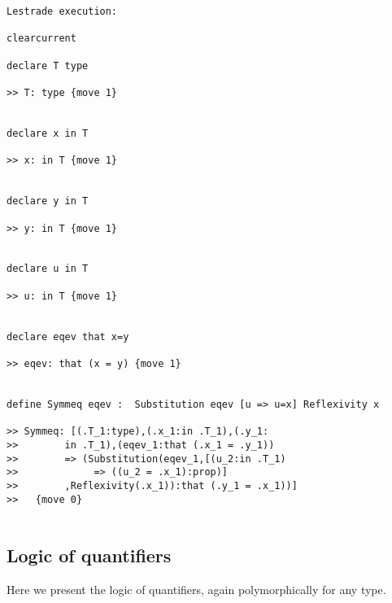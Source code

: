 \documentclass[12pt]{article}
\begin{document}
\begin{verbatim}Lestrade execution:

clearcurrent

declare T type

>> T: type {move 1}


declare x in T

>> x: in T {move 1}


declare y in T

>> y: in T {move 1}


declare u in T

>> u: in T {move 1}


declare eqev that x=y

>> eqev: that (x = y) {move 1}


define Symmeq eqev :  Substitution eqev [u => u=x] Reflexivity x

>> Symmeq: [(.T_1:type),(.x_1:in .T_1),(.y_1:
>>        in .T_1),(eqev_1:that (.x_1 = .y_1)) 
>>        => (Substitution(eqev_1,[(u_2:in .T_1) 
>>             => ((u_2 = .x_1):prop)]
>>        ,Reflexivity(.x_1)):that (.y_1 = .x_1))]
>>   {move 0}


\end{verbatim}

\subsection{Logic of quantifiers}

Here we present the logic of quantifiers, again polymorphically for any type.
\end{document}
